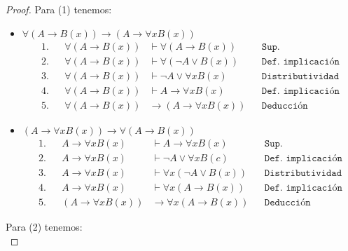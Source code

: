 \documentclass[letterpaper,12pt]{memoir}
\theoremstyle{definition}
\begin{document}
\begin{proof}
  Para (1) tenemos: \\

  \begin{itemize}
    \item \(\forall (A \rightarrow B(x)) \rightarrow (A \rightarrow \forall xB(x))\)
    \begin{align*}
      1. & & \forall (A \rightarrow B(x)) &\vdash \forall (A \rightarrow B(x)) & & \texttt{Sup.}  \\
      2. & & \forall (A \rightarrow B(x)) &\vdash \forall (\neg A \lor B(x)) & & \texttt{Def. implicación}\\
      3. & &  \forall (A \rightarrow B(x)) &\vdash \neg A \lor \forall xB(x) & & \texttt{Distributividad} \\
      4. & &  \forall (A \rightarrow B(x)) &\vdash A \rightarrow \forall xB(x) & & \texttt{Def. implicación} \\
      5. & & \forall (A \rightarrow B(x)) &\rightarrow (A \rightarrow \forall xB(x)) & & \texttt{Deducción} 
    \end{align*}
    \item \( (A \rightarrow \forall xB(x)) \rightarrow \forall (A \rightarrow B(x)) \)
    \begin{align*}
      1. & & A \rightarrow \forall xB(x) &\vdash A \rightarrow \forall xB(x) & &  \texttt{Sup.}  \\
      2. & & A \rightarrow \forall xB(x) &\vdash \neg A \lor \forall xB(c)  & & \texttt{Def. implicación}\\
      3. & & A \rightarrow \forall xB(x) &\vdash \forall x(\neg A \lor B(x)) & & \texttt{Distributividad} \\
      4. & & A \rightarrow \forall xB(x) &\vdash \forall x(A \rightarrow B(x)) & & \texttt{Def. implicación} \\
      5. & & (A \rightarrow \forall xB(x)) &\rightarrow \forall x(A \rightarrow B(x)) & & \texttt{Deducción} 
    \end{align*}
  \end{itemize}


  Para (2) tenemos: \\


\end{proof}
\end{document}
